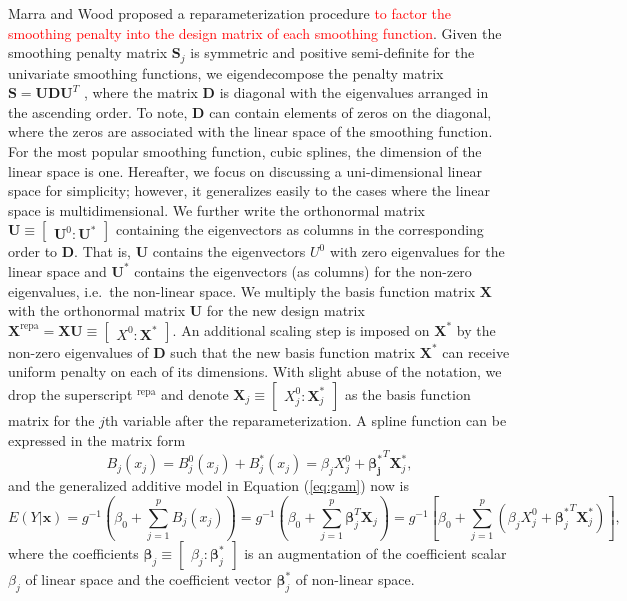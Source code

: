 \documentclass[AMA,STIX1COL,]{WileyNJD-v2}
\begin{document}
Marra and Wood \citep{Marra2011} proposed a reparameterization procedure
\textcolor{red}{to factor the smoothing penalty into the design matrix of each smoothing function}.
Given the smoothing penalty matrix \(\boldsymbol{S}_j\) is symmetric and
positive semi-definite for the univariate smoothing functions, we
eigendecompose the penalty matrix
\(\boldsymbol{S} = \boldsymbol{U} \boldsymbol{D} \boldsymbol{U}^T\) ,
where the matrix \(\boldsymbol{D}\) is diagonal with the eigenvalues
arranged in the ascending order. To note, \(\boldsymbol{D}\) can contain
elements of zeros on the diagonal, where the zeros are associated with
the linear space of the smoothing function. For the most popular
smoothing function, cubic splines, the dimension of the linear space is
one. Hereafter, we focus on discussing a uni-dimensional linear space
for simplicity; however, it generalizes easily to the cases where the
linear space is multidimensional. We further write the orthonormal
matrix
\(\boldsymbol{U} \equiv \begin{bmatrix} \boldsymbol{U}^0 : \boldsymbol{U}^{*}\end{bmatrix}\)
containing the eigenvectors as columns in the corresponding order to
\(\boldsymbol{D}\). That is, \(\boldsymbol{U}\) contains the
eigenvectors \(U^0\) with zero eigenvalues for the linear space and
\(\boldsymbol{U}^{*}\) contains the eigenvectors (as columns) for the
non-zero eigenvalues, i.e.~the non-linear space. We multiply the basis
function matrix \(\boldsymbol{X}\) with the orthonormal matrix
\(\boldsymbol{U}\) for the new design matrix
\({\boldsymbol{X}}^\text{repa}= \boldsymbol{X} \boldsymbol{U} \equiv \begin{bmatrix} X^0 : \boldsymbol{X}^{*} \end{bmatrix}\).
An additional scaling step is imposed on \(\boldsymbol{X}^{*}\) by the
non-zero eigenvalues of \(\boldsymbol{D}\) such that the new basis
function matrix \(\boldsymbol{X}^\ast\) can receive uniform penalty on
each of its dimensions. With slight abuse of the notation, we drop the
superscript \(^\text{repa}\) and denote
\(\boldsymbol{X}_j \equiv \begin{bmatrix} X_j^0 : \boldsymbol{X}_j^{*} \end{bmatrix}\)
as the basis function matrix for the \(j\)th variable after the
reparameterization. A spline function can be expressed in the matrix
form \[
B_j(x_j) = B_j^0(x_j) + B_j^*(x_j) = \beta_j X^0_j + \boldsymbol{\beta_j^*}^T \boldsymbol{X}_j^*,
\] and the generalized additive model in Equation (\ref{eq:gam}) now is
\begin{equation}\label{eq:gam-repa}
E(Y|\boldsymbol{x}) = g^{-1}(\beta_0 + \sum\limits^p_{j=1} B_j(x_j)) = g^{-1}(\beta_0 + \sum\limits^p_{j=1} \boldsymbol{\beta}_j^T \boldsymbol{X}_j) = g^{-1}\left[\beta_0 + \sum\limits^p_{j=1} (\beta_j X^0_j + {\boldsymbol{\beta}_j^*}^T \boldsymbol{X}_j^*)\right],
\end{equation} where the coefficients
\(\boldsymbol{\beta}_j \equiv \begin{bmatrix} \beta_j : \boldsymbol{\beta}^*_j \end{bmatrix}\)
is an augmentation of the coefficient scalar \(\beta_j\) of linear space
and the coefficient vector \(\boldsymbol{\beta}^*_j\) of non-linear
space.
\end{document}
